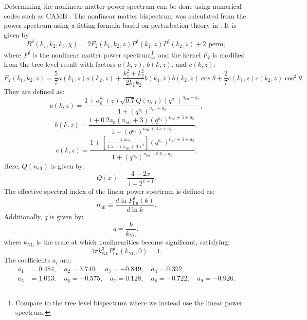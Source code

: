 \documentclass[11pt]{article} %
\begin{document}
Determining the nonlinear matter power spectrum can be done using numerical codes such as CAMB \cite{Lewis2000}. The nonlinear matter bispectrum was calculated from the power spectrum using a fitting formula based on perturbation theory in \cite{bispfit}. It is given by
\begin{equation}
    B^\delta(k_1, k_2, k_3, \chi) = 2 F_2(k_1, k_2, z) P^\delta(k_1, z) P^\delta(k_2, z) + \text{2 perm},
\end{equation}
where \( P^\delta \) is the nonlinear matter power spectrum\footnote{Compare to the tree level bispectrum where we instead use the linear power spectrum.}, and the kernel \( F_2 \) is modified from the tree level result with factors \( a(k, z) \), \( b(k, z) \), and \( c(k, z) \):
\begin{equation}
    F_2(k_1, k_2, z) = \frac{5}{7} a(k_1, z) a(k_2, z) + \frac{k_1^2 + k_2^2}{2 k_1 k_2} b(k_1, z) b(k_2, z) \cos \theta + \frac{2}{7} c(k_1, z) c(k_2, z) \cos^2 \theta.
\end{equation}
They are defined as:
\begin{equation}
    a(k, z) = \frac{1 + \sigma_8^{a_6}(z) \sqrt{0.7} Q(n_{\text{eff}}) (q^{a_1})^{n_{\text{eff}} + a_2}}{1 + (q^{a_1})^{n_{\text{eff}} + a_2}},
\end{equation}
\begin{equation}
    b(k, z) = \frac{1 + 0.2 a_3 (n_{\text{eff}} + 3) (q^{a_7})^{n_{\text{eff}} + 3 + a_8}}{1 + (q^{a_5})^{n_{\text{eff}} + 3.5 + a_8}},
\end{equation}
\begin{equation}
    c(k, z) = \frac{1 + \left[ \frac{4.5 a_4}{1.5 + (n_{\text{eff}} + 3)^4} \right] (q^{a_5})^{n_{\text{eff}} + 3 + a_9}}{1 + (q^{a_5})^{n_{\text{eff}} + 3.5 + a_9}}.
\end{equation}
Here, \( Q(n_{\text{eff}}) \) is given by:
\begin{equation}
    Q(x) = \frac{4 - 2x}{1 + 2^{x+1}}.
\end{equation}
The effective spectral index of the linear power spectrum is defined as:
\begin{equation}
    n_{\text{eff}} \equiv \frac{d \ln P^\delta_{\text{lin}}(k)}{d \ln k}.
\end{equation}
Additionally, \( q \) is given by:
\begin{equation}
    q = \frac{k}{k_{\text{NL}}},
\end{equation}
where \( k_{\text{NL}} \) is the scale at which nonlinearities become significant, satisfying:
\begin{equation}
    4 \pi k_{\text{NL}}^3 P^\delta_{\text{lin}}(k_{\text{NL}}, 0) = 1.
\end{equation}
The coefficients \( a_i \) are:
\begin{align*}
    a_1 &= 0.484, \quad a_2 = 3.740, \quad a_3 = -0.849, \quad a_4 = 0.392, \\
    a_5 &= 1.013, \quad a_6 = -0.575, \quad a_7 = 0.128, \quad a_8 = -0.722, \quad a_9 = -0.926.
\end{align*}
\end{document}
